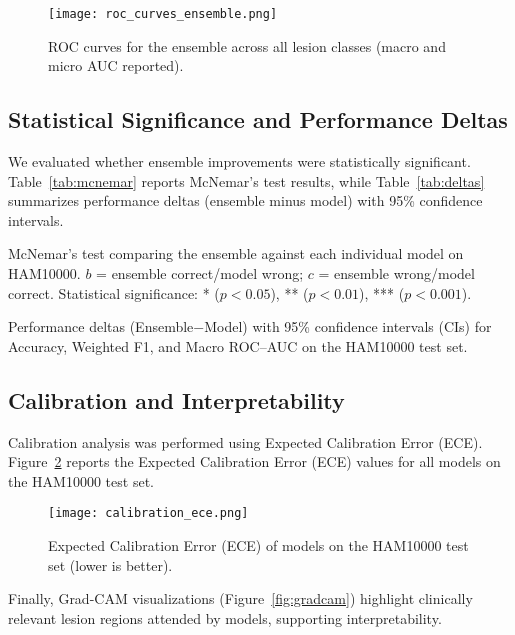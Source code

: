 \documentclass[preprint,12pt]{elsarticle}
\begin{document}
\begin{figure}[htbp]
\centering
\texttt{[image: roc\_curves\_ensemble.png]}
\caption{ROC curves for the ensemble across all lesion classes (macro and micro AUC reported).}
\label{fig:roc}
\end{figure}

\subsection{Statistical Significance and Performance Deltas}
We evaluated whether ensemble improvements were statistically significant.  
Table~\ref{tab:mcnemar} reports McNemar’s test results, while Table~\ref{tab:deltas} summarizes performance deltas (ensemble minus model) with 95\% confidence intervals.  

\begin{table}[htbp]
\centering
\caption{McNemar’s test comparing the ensemble against each individual model on HAM10000. 
$b$ = ensemble correct/model wrong; $c$ = ensemble wrong/model correct. 
Statistical significance: * ($p<0.05$), ** ($p<0.01$), *** ($p<0.001$).}
\label{tab:mcnemar}

\end{table}

\begin{table}[htbp]
\centering
\caption{Performance deltas (Ensemble$-$Model) with 95\% confidence intervals (CIs) for Accuracy, Weighted F1, and Macro ROC--AUC on the HAM10000 test set.}
\label{tab:deltas}

\end{table}

\subsection{Calibration and Interpretability}
Calibration analysis was performed using Expected Calibration Error (ECE).  
Figure~\ref{fig:ece_table} reports the Expected Calibration Error (ECE) values for all models on the HAM10000 test set. 

\begin{figure}[htbp]
\centering
\texttt{[image: calibration\_ece.png]}
\caption{Expected Calibration Error (ECE) of models on the HAM10000 test set (lower is better).}
\label{fig:ece_table}
\end{figure}

Finally, Grad-CAM visualizations (Figure~\ref{fig:gradcam}) highlight clinically relevant lesion regions attended by models, supporting interpretability.  
\end{document}
